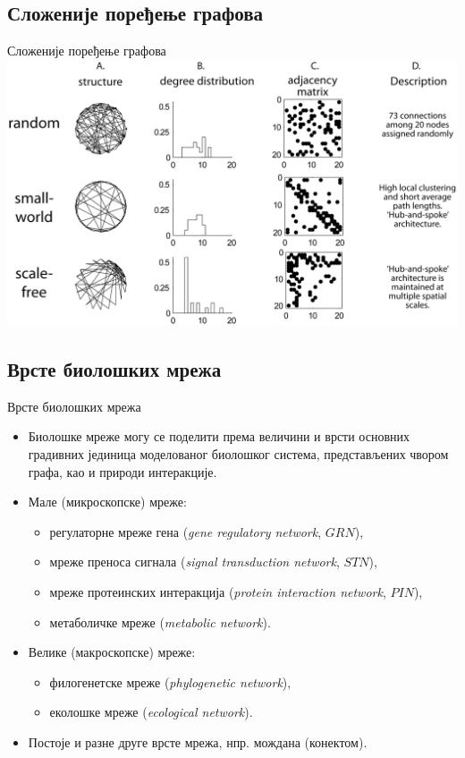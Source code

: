 \documentclass[hyperref={bookmarks=false}]{beamer}
\begin{document}
\subsection{Сложеније поређење графова}
\begin{frame}{Сложеније поређење графова}
\centering\includegraphics[width=.95\textwidth]{osobine2.png}
\end{frame}

\subsection{Врсте биолошких мрежа}
\begin{frame}{Врсте биолошких мрежа}
\begin{itemize}
	\item Биолошке мреже могу се поделити према величини и врсти основних градивних јединица моделованог биолошког система, представљених чвором графа, као и природи интеракције.

	\item Мале (микроскопске) мреже:
	\begin{itemize}
		\item регулаторне мреже гена (\textit{gene regulatory network}, $GRN$),
		\item мреже преноса сигнала (\textit{signal transduction network}, $STN$),
		\item мреже протеинских интеракција (\textit{protein interaction network}, $PIN$),
		\item метаболичке мреже (\textit{metabolic network}).
	\end{itemize}

	\item Велике (макроскопске) мреже:
	\begin{itemize}
		\item филогенетске мреже (\textit{phylogenetic network}),
		\item еколошке мреже (\textit{ecological network}).
	\end{itemize}

	\item Постоје и разне друге врсте мрежа, нпр. мождана (конектом).
\end{itemize}
\end{frame}
\end{document}
